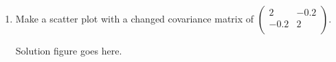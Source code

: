 \documentclass[a4paper]{article}
\theoremstyle{definition}
\newenvironment{soln}{
    \leavevmode\color{blue}\ignorespaces
}{}
\begin{document}
\begin{enumerate}
\begin{soln}
	\end{soln}
\item Make a scatter plot with a changed covariance matrix of $\begin{pmatrix}
    2 & -0.2 \\ -0.2 & 2\\
  \end{pmatrix}$.	\\
  	\begin{soln}
  	    Solution figure goes here.
	\end{soln}
\end{enumerate}





\end{document}

